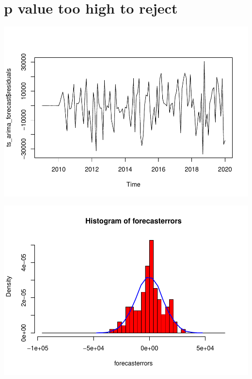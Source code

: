 \documentclass[
]{article}
\newenvironment{Shaded}{\begin{snugshade}}{\end{snugshade}}
\newcommand{\CommentTok}[1]{\textcolor[rgb]{0.56,0.35,0.01}{\textit{#1}}}
\newcommand{\KeywordTok}[1]{\textcolor[rgb]{0.13,0.29,0.53}{\textbf{#1}}}
\newcommand{\NormalTok}[1]{#1}
\newcommand{\OperatorTok}[1]{\textcolor[rgb]{0.81,0.36,0.00}{\textbf{#1}}}
\begin{document}
\hypertarget{p-value-too-high-to-reject}{%
\section{p value too high to reject}\label{p-value-too-high-to-reject}}

\begin{Shaded}
\end{Shaded}

\includegraphics{tsf_export_files/figure-latex/unnamed-chunk-28-1.pdf}

\begin{Shaded}
\end{Shaded}

\includegraphics{tsf_export_files/figure-latex/unnamed-chunk-28-2.pdf}
\end{document}
